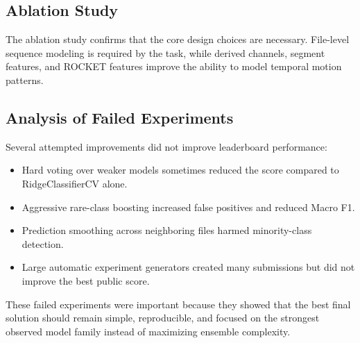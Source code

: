 \documentclass[conference]{IEEEtran}
\begin{document}
\subsection{Ablation Study}
\begin{table}[!t]
\centering
\caption{Ablation study for major technical choices.}
\label{tab:ablationtable}
\end{table}
The ablation study confirms that the core design choices are necessary. File-level sequence modeling is required by the task, while derived channels, segment features, and ROCKET features improve the ability to model temporal motion patterns.
\subsection{Analysis of Failed Experiments}
Several attempted improvements did not improve leaderboard performance:
\begin{itemize}[noitemsep]
    \item Hard voting over weaker models sometimes reduced the score compared to RidgeClassifierCV alone.
    \item Aggressive rare-class boosting increased false positives and reduced Macro F1.
    \item Prediction smoothing across neighboring files harmed minority-class detection.
    \item Large automatic experiment generators created many submissions but did not improve the best public score.
\end{itemize}
These failed experiments were important because they showed that the best final solution should remain simple, reproducible, and focused on the strongest observed model family instead of maximizing ensemble complexity.
\end{document}
